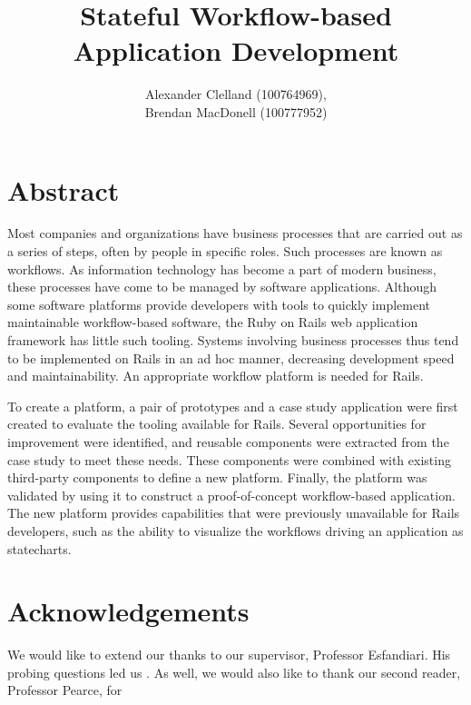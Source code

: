 \documentclass[document.tex]{subfiles}
\begin{document}
\title{Stateful Workflow-based\\Application Development}
\author{
  Alexander Clelland (100764969), \\
  Brendan MacDonell (100777952)
}
\copyrightfalse %

\beforepreface

\chapter*{Abstract}
Most companies and organizations have business processes that are carried out as a series of steps, often by people in specific roles. Such processes are known as workflows. As information technology has become a part of modern business, these processes have come to be managed by software applications. Although some software platforms provide developers with tools to quickly implement maintainable workflow-based software, the Ruby on Rails web application framework has little such tooling. Systems involving business processes thus tend to be implemented on Rails in an ad hoc manner, decreasing development speed and maintainability. An appropriate workflow platform is needed for Rails.

To create a platform, a pair of prototypes and a case study application were first created to evaluate the tooling available for Rails. Several opportunities for improvement were identified, and reusable components were extracted from the case study to meet these needs. These components were combined with existing third-party components to define a new platform. Finally, the platform was validated by using it to construct a proof-of-concept workflow-based application. The new platform provides capabilities that were previously unavailable for Rails developers, such as the ability to visualize the workflows driving an application as statecharts.


\chapter*{Acknowledgements}


We would like to extend our thanks to our supervisor, Professor Esfandiari. His probing questions led us . As well, we would also like to thank our second reader, Professor Pearce, for 
\end{document}
